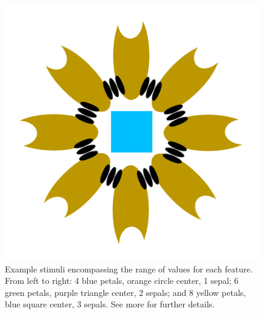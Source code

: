 \documentclass[twocolumn]{svjour3}          %
\begin{document}
\begin{figure}
  \includegraphics[scale=0.15]{flower3.png}
  \caption{Example stimuli encompassing the range of values for each
    feature.  From left to right: 4 blue petals, orange circle center,
    1 sepal; 6 green petals, purple triangle center, 2 sepals; and 8
    yellow petals, blue square center, 3 sepals. See more
    \citet{DeBrigard2017} for further details.}
  \label{fig:flowers}
\end{figure}
\end{document}
